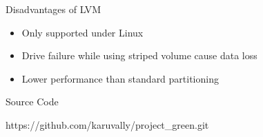 \documentclass{beamer}
\begin{document}
\begin{frame}{Disadvantages of LVM}
    \begin{itemize}
        \item<2-> Only supported under Linux
        \item<3-> Drive failure while using striped volume cause data loss
        \item<5-> Lower performance than standard partitioning
    \end{itemize}
\end{frame}

\begin{frame}{Source Code} 
    \begin{center}
        \large https://github.com/karuvally/project\_green.git
    \end{center}
\end{frame}
\end{document}

